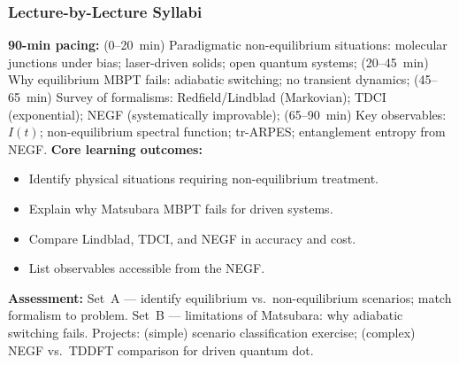 \documentclass[11pt,a4paper]{article}
\begin{document}
\subsubsection*{Lecture-by-Lecture Syllabi}

\begin{tcolorbox}[modulebox, title={Module~II.5 / L01: Motivation and Scope of NEGF}]
\textbf{90-min pacing:} (0--20~min) Paradigmatic non-equilibrium situations: molecular junctions under bias; laser-driven solids; open quantum systems; (20--45~min) Why equilibrium MBPT fails: adiabatic switching; no transient dynamics; (45--65~min) Survey of formalisms: Redfield/Lindblad (Markovian); TDCI (exponential); NEGF (systematically improvable); (65--90~min) Key observables: $I(t)$; non-equilibrium spectral function; tr-ARPES; entanglement entropy from NEGF.
\medskip\textbf{Core learning outcomes:}
\begin{itemize}[leftmargin=1.4em,topsep=2pt,itemsep=1pt]
  \item Identify physical situations requiring non-equilibrium treatment.
  \item Explain why Matsubara MBPT fails for driven systems.
  \item Compare Lindblad, TDCI, and NEGF in accuracy and cost.
  \item List observables accessible from the NEGF.
\end{itemize}
\medskip\textbf{Assessment:}
Set~A --- identify equilibrium vs.\ non-equilibrium scenarios; match formalism to problem.
Set~B --- limitations of Matsubara: why adiabatic switching fails.
Projects: (simple) scenario classification exercise; (complex) NEGF vs.\ TDDFT comparison for driven quantum dot.
\end{tcolorbox}

\medskip
\end{document}
